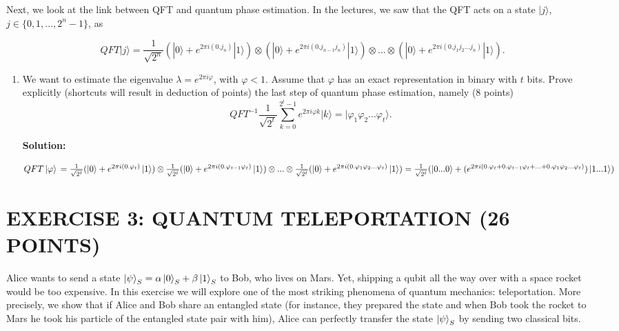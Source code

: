 \documentclass[12pt]{article}
\begin{document}
Next, we look at the link between QFT and quantum phase estimation. In the lectures, we saw that the QFT acts on a state $|j\rangle$, $j \in \{0, 1, ..., 2^{n} - 1\}$, as

$$
    QFT|j\rangle = \frac{1}{\sqrt{2^n}}(|0\rangle + e^{2\pi i(0.j_n)}|1\rangle) \otimes (|0\rangle + e^{2\pi i(0.j_{n-1}j_n)}|1\rangle) \otimes ... \otimes (|0\rangle + e^{2\pi i(0.j_1j_2...j_n)}|1\rangle).
$$

\begin{enumerate}[start=4]
    \item We want to estimate the eigenvalue $\lambda = e^{2\pi i\varphi}$, with $\varphi < 1$. Assume that $\varphi$ has an exact representation in binary with $t$ bits. Prove explicitly (shortcuts will result in deduction of points) the last step of quantum phase estimation, namely (8 points)
          $$
              QFT^{-1}\frac{1}{\sqrt{2^t}}\sum_{k=0}^{2^t-1}e^{2\pi i\varphi k}|k\rangle = |\varphi_1\varphi_2...\varphi_t\rangle.
          $$


          \textbf{Solution:}

          $QFT\ket{\varphi}
              \\=\frac{1}{\sqrt{2^t}}(\ket{0}+e^{2\pi i(0.\varphi_t)}\ket{1})\otimes \frac{1}{\sqrt{2^t}}(\ket{0}+e^{2\pi i(0.\varphi_{t-1}\varphi_{t})}\ket{1}) \otimes ... \otimes \frac{1}{\sqrt{2^t}}(\ket{0}+e^{2\pi i(0.\varphi_{1}\varphi_{2}...\varphi_{t})}\ket{1})
              \\=\frac{1}{\sqrt{2^t}}(\ket{0...0}+(e^{2\pi i(0.\varphi_t+0.\varphi_{t-1}\varphi_{t}+...+0.\varphi_{1}\varphi_{2}...\varphi_{t})})\ket{1...1})
          $
\end{enumerate}

\section{EXERCISE 3: QUANTUM TELEPORTATION (26 POINTS)}

Alice wants to send a state $\ket{\psi}_S = \alpha\ket{0}_S + \beta\ket{1}_S$ to Bob, who lives on Mars. Yet, shipping a qubit all the way over with a space rocket would be too expensive. In this exercise we will explore one of the most striking phenomena of quantum mechanics: teleportation. More precisely, we show that if Alice and Bob share an entangled state (for instance, they prepared the state and when Bob took the rocket to Mars he took his particle of the entangled state pair with him), Alice can perfectly transfer the state $\ket{\psi}_S$ by sending two classical bits.
\end{document}
